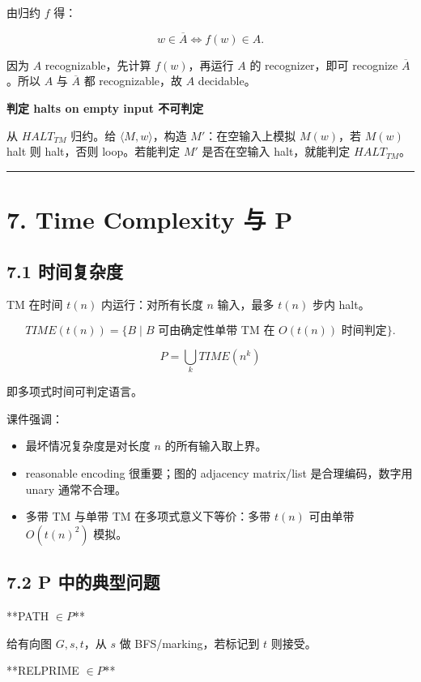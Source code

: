 ﻿\documentclass[UTF8,11pt]{ctexart}
\begin{document}
由归约 \(f\) 得：

\[
w\in\overline A \iff f(w)\in A.
\]

因为 \(A\) recognizable，先计算 \(f(w)\)，再运行 \(A\) 的 recognizer，即可 recognize \(\overline A\)。所以 \(A\) 与 \(\overline A\) 都 recognizable，故 \(A\) decidable。


\textbf{判定 halts on empty input 不可判定}


从 \(HALT_{TM}\) 归约。给 \(\langle M,w\rangle\)，构造 \(M'\)：在空输入上模拟 \(M(w)\)，若 \(M(w)\) halt 则 halt，否则 loop。若能判定 \(M'\) 是否在空输入 halt，就能判定 \(HALT_{TM}\)。


\bigskip\hrule\bigskip


\section{7. Time Complexity 与 P}


\subsection{7.1 时间复杂度}


TM 在时间 \(t(n)\) 内运行：对所有长度 \(n\) 输入，最多 \(t(n)\) 步内 halt。


\[
TIME(t(n))=\{B\mid B\text{ 可由确定性单带 TM 在 }O(t(n))\text{ 时间判定}\}.
\]


\[
P=\bigcup_k TIME(n^k)
\]

即多项式时间可判定语言。


课件强调：


\begin{itemize}
\item 最坏情况复杂度是对长度 \(n\) 的所有输入取上界。
\item reasonable encoding 很重要；图的 adjacency matrix/list 是合理编码，数字用 unary 通常不合理。
\item 多带 TM 与单带 TM 在多项式意义下等价：多带 \(t(n)\) 可由单带 \(O(t(n)^2)\) 模拟。
\end{itemize}


\subsection{7.2 P 中的典型问题}


**PATH \(\in P\)**  

给有向图 \(G,s,t\)，从 \(s\) 做 BFS/marking，若标记到 \(t\) 则接受。


**RELPRIME \(\in P\)**  
\end{document}
